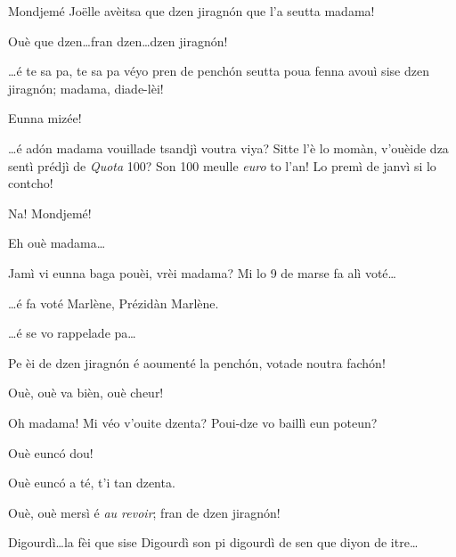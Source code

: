 \begin{drama}
\Dallasspeaks {} Mondjemé Jo\"{e}lle avèitsa que dzen jiragn\'on que l'a seutta madama!

\Joellespeaks {} Ouè que dzen\ldots fran dzen\ldots dzen jiragn\'on!

\Dallasspeaks \ldots é te sa pa, te sa pa véyo pren de pench\'on seutta poua fenna avouì sise dzen jiragn\'on; madama, diade-lèi!

\Saventaspeaks Eunna mizée!

\Dallasspeaks \ldots é ad\'on madama vouillade tsandjì voutra viya? Sitte l'è lo momàn, v'ouèide dza sentì prédjì de \textit{Quota} 100? Son 100 meulle \textit{euro} to l'an! Lo premì de janvì si lo contcho!

\Saventaspeaks Na! Mondjemé!

\Joellespeaks Eh ouè madama\ldots

\Dallasspeaks Jamì vi eunna baga pouèi, vrèi madama? Mi lo 9 de marse fa alì voté\ldots

\Joellespeaks \ldots é fa voté Marlène, Prézidàn Marlène.

\Dallasspeaks \ldots é se vo rappelade pa\ldots

\Joelledallasspeaks {} Pe èi de dzen jiragn\'on é aoumenté la pench\'on, votade noutra fach\'on!


\Saventaspeaks Ouè, ouè va bièn, ouè cheur!

\Dallasspeaks  Oh madama! Mi véo v'ouite dzenta? Poui-dze vo baillì eun poteun?

\Saventaspeaks {} Ouè eunc\'o dou!


\Saventaspeaks {} Ouè eunc\'o a té, t'i tan dzenta.

\Joellespeaks {} Ouè, ouè mersì é \textit{au revoir};  fran de dzen jiragn\'on!


\Saventaspeaks {} Digourdì\ldots la fèi que sise Digourdì son pi digourdì de sen que diyon de itre\ldots



\end{drama}
